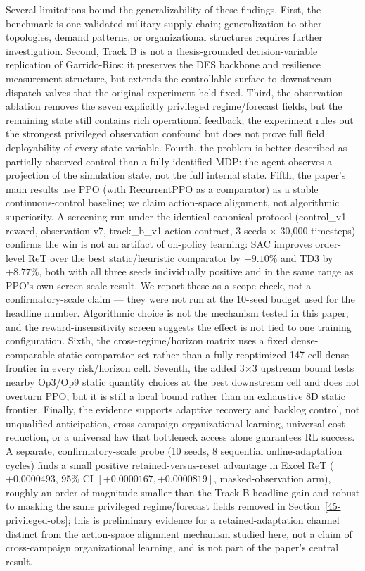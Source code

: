 Several limitations bound the generalizability of these findings. First, the
benchmark is one validated military supply chain; generalization to other
topologies, demand patterns, or organizational structures requires further
investigation. Second, Track B is not a thesis-grounded decision-variable
replication of Garrido-Rios: it preserves the DES backbone and resilience
measurement structure, but extends the controllable surface to downstream
dispatch valves that the original experiment held fixed. Third, the
observation ablation removes the seven explicitly privileged regime/forecast
fields, but the remaining state still contains rich operational feedback; the
experiment rules out the strongest privileged observation confound but does
not prove full field deployability of every state variable.
Fourth, the problem is better described as partially observed control than a
fully identified MDP: the agent observes a projection of the simulation state,
not the full internal state. Fifth, the paper's main results use PPO (with
RecurrentPPO as a comparator) as a stable continuous-control baseline; we
claim action-space alignment, not algorithmic superiority. A screening run
under the identical canonical protocol (control\_v1 reward, observation v7,
track\_b\_v1 action contract, 3 seeds $\times$ 30{,}000 timesteps) confirms
the win is not an artifact of on-policy learning: SAC improves order-level
ReT over the best static/heuristic comparator by $+9.10\%$ and TD3 by
$+8.77\%$, both with all three seeds individually positive and in the same
range as PPO's own screen-scale result. We report these as a scope check,
not a confirmatory-scale claim --- they were not run at the 10-seed budget
used for the headline number. Algorithmic choice is not the mechanism
tested in this paper,
and the reward-insensitivity screen suggests the effect is not tied to
one training configuration. Sixth, the
cross-regime/horizon matrix uses a fixed dense-comparable static comparator
set rather than a fully reoptimized 147-cell dense frontier in every
risk/horizon cell. Seventh, the added 3$\times$3 upstream bound tests
nearby Op3/Op9 static quantity choices at the best downstream cell and
does not overturn PPO, but it is still a local bound rather than an
exhaustive 8D static frontier. Finally, the evidence supports adaptive recovery and
backlog control, not unqualified anticipation, cross-campaign organizational
learning, universal cost reduction, or a universal law that bottleneck access
alone guarantees RL success. A separate, confirmatory-scale probe
(10 seeds, 8 sequential online-adaptation cycles) finds a small positive
retained-versus-reset advantage in Excel ReT ($+0.0000493$, 95\% CI
$[+0.0000167, +0.0000819]$, masked-observation arm), roughly an order of
magnitude smaller than the Track B headline gain and robust to masking
the same privileged regime/forecast fields removed in
Section~\ref{45-privileged-obs}; this is preliminary evidence for a
retained-adaptation channel distinct from the action-space alignment
mechanism studied here, not a claim of cross-campaign organizational
learning, and is not part of the paper's central result.

